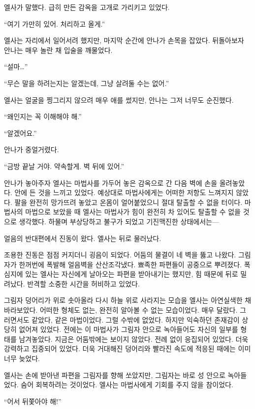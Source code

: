 엘사가 말했다. 급히 만든 감옥을 고개로 가리키고 있었다.

``여기 가만히 있어. 처리하고 올게.''

엘사는 자리에서 일어서려 했지만, 마지막 순간에 안나가 손목을 잡았다. 뒤돌아보자 안나는 매우 놀란 채 입술을 깨물었다.

``설마\ldots''

``무슨 말을 하려는지는 알겠는데, 그냥 살려둘 수는 없어.''

엘사는 얼굴을 찡그리지 않으려 매우 애를 썼지만, 안나는 그저 너무도 순진했다.

``왜인지는 꼭 이해해야 해.''

``알겠어요.''

안나가 중얼거렸다.

``금방 끝날 거야. 약속할게. 벽 뒤에 있어.''

안나가 놓아주자 엘사는 마법사를 가두어 놓은 감옥으로 간 다음 벽에 손을 올려놓았다. 안에 든 것을 느끼고 있었다. 예상대로 마법사에게는 어떠한 저항도 느껴지지 않았다. 팔을 완전히 망가뜨려 놓았고 온몸이 얼어붙었으니 절대 탈출할 수 없을 터이다. 마법사의 마법으로 보았을 때 엘사는 마법사가 힘이 완전히 차 있어도 탈출할 수 없을 것으로 생각했다. 하물며 부상당하고 불구가 되었고 기진맥진한 상태에서는—

얼음의 반대편에서 진동이 왔다. 엘사는 뒤로 물러났다.

조용한 진동은 점점 커지더니 굉음이 되었다. 어둠의 물결이 네 벽을 뚫고 나왔다. 그림자가 한꺼번에 폭발해 얼음벽을 산산조각냈다. 뾰족한 파편들이 공중으로 뿌려졌다. 폭심지에 있는 엘사는 자신에게 날아오는 파편을 받아내기는 했지만, 힘 때문에 뒤로 밀려났다. 반격할 소중한 시간을 허비하고 있었다.

그림자 덩어리가 위로 솟아올라 다시 하늘 위로 사라지는 모습을 엘사는 아연실색한 채 바라보았다. 어떠한 형체도 없는, 완전히 알아볼 수 없는 모습이었다. 매우 달랐다. 그러면서도 같았다, 같은 마법이었다. 그럴 수밖에 없었다. 하지만 익숙하던 존재감이 상당히 없어져 있었다. 전에는 이 마법사가 그림자 안으로 녹아들어도 자신의 일부를 형태를 남겨놓았다. 지금은 어둠밖에는 보이지 않았다. 전례 없이 응집되어 있었다. 더욱 강력하고 집중되어 있었다. 더욱 거대해진 덩어리와 빨라진 속도에 적응된 때에는 이미 너무 늦었다.

엘사는 손에 받아낸 파편을 그림자를 향해 쏘았지만, 그림자는 바로 성 안으로 녹아들었다. 숨어 회복하려는 것이었다. 엘사는 마법사에게 기회를 주지 않을 참이었다.

``어서 뒤쫓아야 해!''

